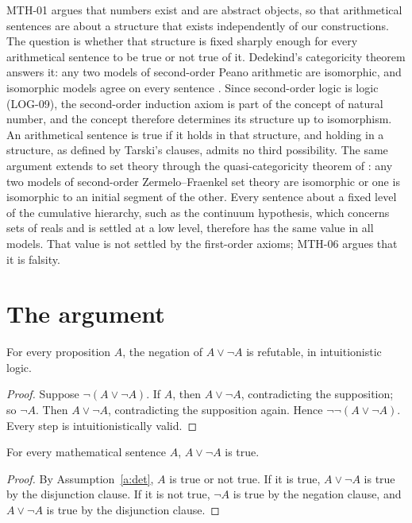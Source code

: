 \documentclass{situationist-preprint}
\begin{document}
MTH-01 argues that numbers exist and are abstract objects, so that arithmetical sentences are about a structure that exists independently of our constructions. The question is whether that structure is fixed sharply enough for every arithmetical sentence to be true or not true of it. Dedekind's categoricity theorem answers it: any two models of second-order Peano arithmetic are isomorphic, and isomorphic models agree on every sentence \citep{Shapiro1991}. Since second-order logic is logic (LOG-09), the second-order induction axiom is part of the concept of natural number, and the concept therefore determines its structure up to isomorphism. An arithmetical sentence is true if it holds in that structure, and holding in a structure, as defined by Tarski's clauses, admits no third possibility. The same argument extends to set theory through the quasi-categoricity theorem of \citet{Zermelo1930}: any two models of second-order Zermelo--Fraenkel set theory are isomorphic or one is isomorphic to an initial segment of the other. Every sentence about a fixed level of the cumulative hierarchy, such as the continuum hypothesis, which concerns sets of reals and is settled at a low level, therefore has the same value in all models. That value is not settled by the first-order axioms; MTH-06 argues that it is falsity.

\section{The argument}

\begin{proposition}[Irrefutability]\label{p:irref}
For every proposition $A$, the negation of $A \vee \neg A$ is refutable, in intuitionistic logic.
\end{proposition}

\begin{proof}
Suppose $\neg(A \vee \neg A)$. If $A$, then $A \vee \neg A$, contradicting the supposition; so $\neg A$. Then $A \vee \neg A$, contradicting the supposition again. Hence $\neg\neg(A \vee \neg A)$. Every step is intuitionistically valid.
\end{proof}

\begin{theorem}\label{t:lem}
For every mathematical sentence $A$, $A \vee \neg A$ is true.
\end{theorem}

\begin{proof}
By Assumption~\ref{a:det}, $A$ is true or not true. If it is true, $A \vee \neg A$ is true by the disjunction clause. If it is not true, $\neg A$ is true by the negation clause, and $A \vee \neg A$ is true by the disjunction clause.
\end{proof}
\end{document}
